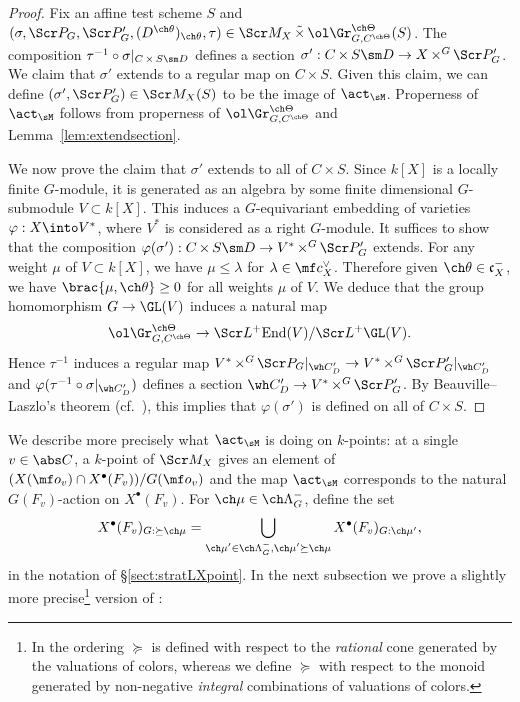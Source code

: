 \documentclass[final]{amsart}
\theoremstyle{remark}
\theoremstyle{definition}
\DeclareMathOperator*{\ttimes}{\tilde\times}
\DeclareMathOperator*{\xt}{\times}
\numberwithin{equation}{section}
\begin{document}
\begin{proof}
Fix an affine test scheme $S$ and $(\sigma,\Scr P_G,\Scr P'_G, (D^{\ch\theta})_{\ch\theta},\tau) \in \Scr M_X \ttimes \ol\Gr^{\ch\Theta}_{G,C^{\ch\Theta}}(S)$. 
The composition $\tau^{-1} \circ \sigma|_{C\xt S\sm D}$ defines
a section $\sigma' : C\xt S \sm D \to X\xt^G \Scr P'_G$. 
We claim that $\sigma'$ extends to a regular map on $C\xt S$. 
Given this claim, we can define $(\sigma',\Scr P'_G)\in \Scr M_X(S)$ 
to be the image of $\act_\sM$. Properness of $\act_\sM$
follows from properness of $\ol\Gr^{\ch\Theta}_{G,C^{\ch\Theta}}$
and Lemma~\ref{lem:extendsection}.

We now prove the claim that $\sigma'$ extends to all of $C\xt S$.
Since $k[X]$ is a locally finite $G$-module, it is generated as an
algebra by some finite dimensional $G$-submodule $V \subset k[X]$. 
This induces a $G$-equivariant embedding of varieties $\varphi: X\into V^*$,
where $V^{*}$ is considered as a right $G$-module. 
It suffices to show that the composition $\varphi(\sigma'):
C\xt S\sm D \to V^{*} \xt^G \Scr P'_G$ extends. 
For any weight $\mu$ of $V \subset k[X]$, we have $\mu \le \lambda$ for $\lambda\in \mf c_X^\vee$. 
Therefore given $\ch\theta\in \mathfrak c_X^-$, we have $\brac{\mu,\ch\theta}\ge 0$
for all weights $\mu$ of $V$. 
We deduce that the group homomorphism $G \to \GL(V)$ induces a natural map
\[ \ol\Gr^{\ch\Theta}_{G,C^{\ch\Theta}} \to 
\Scr L^+\mathrm{End}(V)/\Scr L^+\GL(V). \]
Hence $\tau^{-1}$ induces a regular map 
$V^{*} \xt^G\Scr P_G|_{\wh C'_D} \to V^{*} \xt^G\Scr P'_G|_{\wh C'_D}$
and $\varphi(\tau^{-1}\circ \sigma|_{\wh C'_D})$ defines a section 
$\wh C'_D \to V^{*} \xt^G \Scr P'_G$. 
By Beauville--Laszlo's theorem (cf.~\cite[Theorem 2.12.1]{BD}), 
this implies that $\varphi(\sigma')$ is defined on all of $C\xt S$.
\end{proof}


We describe more precisely what $\act_\sM$ is doing on $k$-points: 
at a single $v \in \abs C$, a $k$-point of $\Scr M_X$ gives an element
of $(X(\mf o_v)\cap X^\bullet(F_v)) / G(\mf o_v)$ and the map $\act_\sM$ corresponds
to the natural $G(F_v)$-action on $X^\bullet(F_v)$.
For $\ch\mu \in \ch\Lambda^-_G$, 
define the set  
\[ X^\bullet(F_v)_{G:\succeq \ch\mu} = \bigcup_{\substack{\ch\mu' \in \ch\Lambda^-_G, \ch\mu' \succeq \ch\mu}} X^\bullet(F_v)_{G:\ch\mu'}, \]
in the notation of \S \ref{sect:stratLXpoint}.
In the next subsection we prove a slightly more precise\footnote{In \cite{SV} 
the ordering $\succeq$ is defined with respect to the \emph{rational} cone generated by
the valuations of colors, whereas we define $\succeq$ with respect
to the monoid generated by non-negative \emph{integral} combinations of valuations of colors.} 
version of \cite[Lemma 5.5.2]{SV}:
\end{document}
